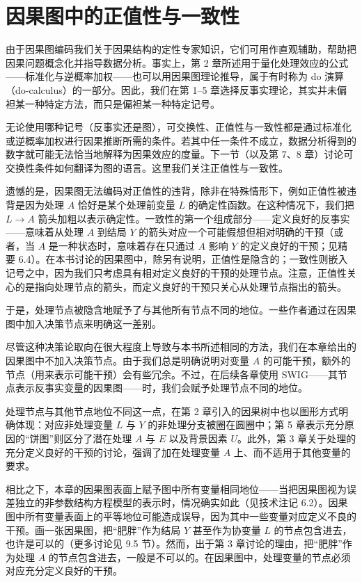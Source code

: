 \section{因果图中的正值性与一致性}

由于因果图编码我们关于因果结构的定性专家知识，它们可用作直观辅助，帮助把因果问题概念化并指导数据分析。事实上，第 2 章所述用于量化处理效应的公式——标准化与逆概率加权——也可以用因果图理论推导，属于有时称为 do 演算（do-calculus）的一部分。因此，我们在第 1--5 章选择反事实理论，其实并未偏袒某一种特定方法，而只是偏袒某一种特定记号。


无论使用哪种记号（反事实还是图），可交换性、正值性与一致性都是通过标准化或逆概率加权进行因果推断所需的条件。若其中任一条件不成立，数据分析得到的数字就可能无法恰当地解释为因果效应的度量。下一节（以及第 7、8 章）讨论可交换性条件如何翻译为图的语言。这里我们关注正值性与一致性。

遗憾的是，因果图无法编码对正值性的违背，除非在特殊情形下，例如正值性被违背是因为处理 $A$ 恰好是某个处理前变量 $L$ 的确定性函数。在这种情况下，我们把 $L\to A$ 箭头加粗以表示确定性。一致性的第一个组成部分——定义良好的反事实——意味着从处理 $A$ 到结局 $Y$ 的箭头对应一个可能假想但相对明确的干预（或者，当 $A$ 是一种状态时，意味着存在只通过 $A$ 影响 $Y$ 的定义良好的干预；见精要 6.4）。在本书讨论的因果图中，除另有说明，正值性是隐含的；一致性则嵌入记号之中，因为我们只考虑具有相对定义良好的干预的处理节点。注意，正值性关心的是指向处理节点的箭头，而定义良好的干预只关心从处理节点指出的箭头。

于是，处理节点被隐含地赋予了与其他所有节点不同的地位。一些作者通过在因果图中加入决策节点来明确这一差别。


尽管这种决策论取向在很大程度上导致与本书所述相同的方法，我们在本章给出的因果图中不加入决策节点。由于我们总是明确说明对变量 $A$ 的可能干预，额外的节点（用来表示可能干预）会有些冗余。不过，在后续各章使用 SWIG——其节点表示反事实变量的因果图——时，我们会赋予处理节点不同的地位。

处理节点与其他节点地位不同这一点，在第 2 章引入的因果树中也以图形方式明确体现：对应非处理变量 $L$ 与 $Y$ 的非处理分支被圈在圆圈中；第 5 章表示充分原因的“饼图”则区分了潜在处理 $A$ 与 $E$ 以及背景因素 $U$。此外，第 3 章关于处理的充分定义良好的干预的讨论，强调了加在处理变量 $A$ 上、而不适用于其他变量的要求。

相比之下，本章的因果图表面上赋予图中所有变量相同地位——当把因果图视为误差独立的非参数结构方程模型的表示时，情况确实如此（见技术注记 6.2）。因果图中所有变量表面上的平等地位可能造成误导，因为其中一些变量对应定义不良的干预。画一张因果图，把“肥胖”作为结局 $Y$ 甚至作为协变量 $L$ 的节点包含进去，也许是可以的（更多讨论见 9.5 节）。然而，出于第 3 章讨论的理由，把“肥胖”作为处理 $A$ 的节点包含进去，一般是不可以的。在因果图中，处理变量的节点必须对应充分定义良好的干预。

